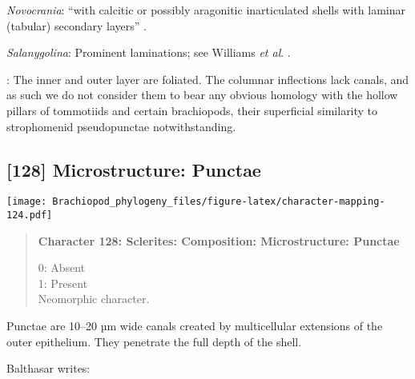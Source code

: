 \documentclass[openany]{book}
\theoremstyle{definition}
\theoremstyle{definition}
\theoremstyle{definition}
\theoremstyle{remark}
\begin{document}
\hypertarget{Novocrania-coding-127}{}
\emph{Novocrania}: ``with calcitic or possibly aragonitic inarticulated
shells with laminar (tabular) secondary layers''
\citep{Williams2000LinguliformeaCraniiformea}.

\hypertarget{Salanygolina-coding-127}{}
\emph{Salanygolina}: Prominent laminations; see Williams \emph{et al}.
\citeyearpar{Williams2004Chemicostructure}.

\hypertarget{TAXLABELS-coding-127}{}
: The inner and outer layer are foliated. The columnar inflections lack
canals, and as such we do not consider them to bear any obvious homology
with the hollow pillars of tommotiids and certain brachiopods, their
superficial similarity to strophomenid pseudopunctae notwithstanding.

\subsection*{{[}128{]} Microstructure:
Punctae}\label{microstructure-punctae}

\texttt{[image: Brachiopod\_phylogeny\_files/figure-latex/character-mapping-124.pdf]}

\begin{quote}
\textbf{Character 128: Sclerites: Composition: Microstructure: Punctae}

0: Absent\\
1: Present\\
Neomorphic character.
\end{quote}

Punctae are 10--20 µm wide canals created by multicellular extensions of
the outer epithelium. They penetrate the full depth of the shell.

Balthasar \citeyearpar{Balthasar2008iMummpikia} writes:
\end{document}
